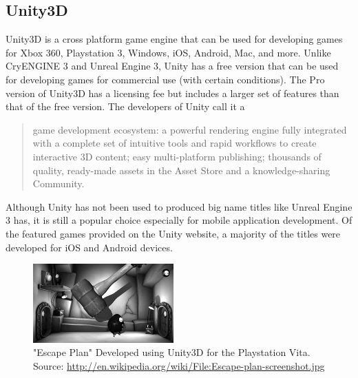 \subsection{Unity3D}
Unity3D is a cross platform game engine that can be used for developing games for Xbox 360, Playstation 3, Windows, iOS, Android, Mac, and more. Unlike CryENGINE 3 and Unreal Engine 3, Unity has a free version that can be used for developing games for commercial use (with certain conditions). The Pro version of Unity3D has a licensing fee but includes a larger set of features than that of the free version. The developers of Unity call it a 
\begin{quote}
game development ecosystem: a powerful rendering engine fully integrated with a complete set of intuitive tools and rapid workflows to create interactive 3D content; easy multi-platform publishing; thousands of quality, ready-made assets in the Asset Store and a knowledge-sharing Community. \cite{unity3d}
\end{quote}
Although Unity has not been used to produced big name titles like Unreal Engine 3 has, it is still a popular choice especially for mobile application development. Of the featured games provided on the Unity website, a majority of the titles were developed for iOS and Android devices.
\begin{figure}[!ht]
  \centering \includegraphics[width=0.48\textwidth]{Images/Escape-plan-screenshot.jpg}
	\caption{"Escape Plan" Developed using Unity3D for the Playstation Vita. Source: \url{http://en.wikipedia.org/wiki/File:Escape-plan-screenshot.jpg}}
\end{figure}

